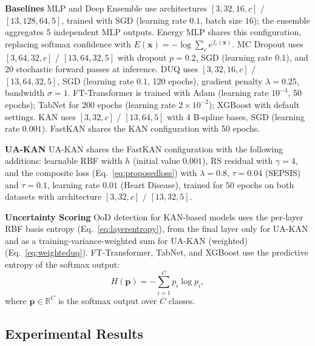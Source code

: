 \documentclass[conference]{IEEEtran}
\begin{document}
\noindent \textbf{Baselines} MLP and Deep Ensemble \cite{lakshminarayanan2017simplescalablepredictiveuncertainty} use architectures $[3,32,16,c]$ / $[13,128,64,5]$, trained with SGD (learning rate $0.1$, batch size $16$); the ensemble aggregates 5 independent MLP outputs. Energy MLP \cite{liu2020energy} shares this configuration, replacing softmax confidence with $E(\mathbf{x}) = -\log\sum_c e^{f_c(\mathbf{x})}$. MC Dropout \cite{gal2016dropoutbayesianapproximationrepresenting} uses $[3,64,32,c]$ / $[13,64,32,5]$ with dropout $p=0.2$, SGD (learning rate $0.1$), and 20 stochastic forward passes at inference. DUQ \cite{vanamersfoort2020uncertaintyestimationusingsingle} uses $[3,32,16,c]$ / $[13,64,32,5]$, SGD (learning rate $0.1$, 120 epochs), gradient penalty $\lambda=0.25$, bandwidth $\sigma=1$. FT-Transformer \cite{gorishniy2021revisiting} is trained with Adam (learning rate $10^{-4}$, 50 epochs); TabNet \cite{arik2021tabnet} for 200 epochs (learning rate $2\times10^{-2}$); XGBoost \cite{chen2016xgboost} with default settings. KAN \cite{liu2025kankolmogorovarnoldnetworks} uses $[3,32,c]$ / $[13,64,5]$ with 4 B-spline bases, SGD (learning rate $0.001$). FastKAN \cite{li2024kolmogorovarnoldnetworksradialbasis} shares the KAN configuration with 50 epochs.

\noindent \textbf{UA-KAN} UA-KAN shares the FastKAN configuration with the following additions: learnable RBF width $h$ (initial value $0.001$), RS residual with $\gamma=4$, and the composite loss (Eq.~\ref{eq:proposedloss}) with $\lambda=0.8$, $\tau=0.04$ (SEPSIS) and $\tau=0.1$, learning rate $0.01$ (Heart Disease), trained for 50 epochs on both datasets with architecture $[3,32,c]$ / $[13,32,5]$.


\noindent \textbf{Uncertainty Scoring} OoD detection for KAN-based models uses the per-layer RBF basis entropy (Eq.~\ref{eq:layerentropy}), from the final layer only for UA-KAN and as a training-variance-weighted sum for UA-KAN (weighted) (Eq.~\ref{eq:weighteduq}). FT-Transformer, TabNet, and XGBoost use the predictive entropy of the softmax output:
\begin{equation} \label{eq:entropy}
H(\mathbf{p}) = -\sum_{i=1}^{C} p_i \log p_i,
\end{equation}
where $\mathbf{p} \in \mathbb{R}^C$ is the softmax output over $C$ classes.

\subsection{Experimental Results}
\end{document}
